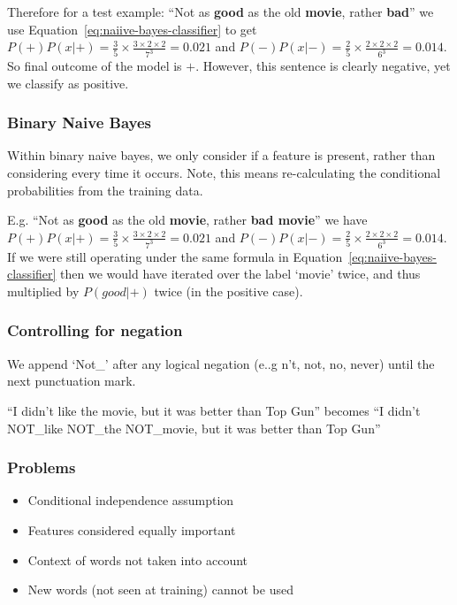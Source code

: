 \documentclass[11pt]{article}
\begin{document}
Therefore for a test example: ``Not as \textbf{good} as the old \textbf{movie}, rather \textbf{bad}'' we use Equation~\ref{eq:naiive-bayes-classifier} to get $P(+)P(x|+) = \frac 3 5 \times \frac{3\times 2 \times 2}{7^3} = 0.021$ and $P(-)P(x|-) = \frac 2 5 \times \frac{2\times 2 \times 2}{6^3} = 0.014$. So final outcome of the model is $+$. However, this sentence is clearly negative, yet we classify as positive.

\subsubsection{Binary Naive Bayes}

Within binary naive bayes, we only consider if a feature is present, rather than considering every time it occurs. Note, this means re-calculating the conditional probabilities from the training data.

E.g. ``Not as \textbf{good} as the old \textbf{movie}, rather \textbf{bad movie}'' we have $P(+)P(x|+) = \frac 3 5 \times \frac{3\times 2 \times 2}{7^3} = 0.021$ and $P(-)P(x|-) = \frac 2 5 \times \frac{2 \times 2 \times 2}{6^3} = 0.014$. If we were still operating under the same formula in Equation~\ref{eq:naiive-bayes-classifier} then we would have iterated over the label `movie' twice, and thus multiplied by $P(good|+)$ twice (in the positive case).

\subsubsection{Controlling for negation}

We append `Not\_' after any logical negation (e..g n't, not, no, never) until the next punctuation mark.

``I didn't like the movie, but it was better than Top Gun'' becomes ``I didn't NOT\_like NOT\_the NOT\_movie, but it was better than Top Gun''

\subsubsection{Problems}

\begin{itemize}
    \item Conditional independence assumption
    \item Features considered equally important
    \item Context of words not taken into account
    \item New words (not seen at training) cannot be used
\end{itemize}
\end{document}

